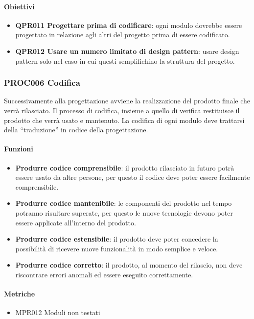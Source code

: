         \paragraph*{Obiettivi}
        \begin{itemize}
            \item \textbf{QPR011 Progettare prima di codificare}: ogni modulo dovrebbe essere progettato in relazione agli altri del progetto prima di essere codificato.
            \item \textbf{QPR012 Usare un numero limitato di design pattern}: usare design pattern solo nel caso in cui questi semplifichino la struttura del progetto.
        \end{itemize}

    \subsubsection{PROC006 Codifica}\label{proc006}
    Successivamente alla progettazione avviene la realizzazione del prodotto finale che verrà rilasciato. Il processo di codifica, insieme a quello di verifica restituisce il prodotto che verrà usato e mantenuto. La codifica di ogni modulo deve trattarsi della ``traduzione'' in codice della progettazione.

        \paragraph*{Funzioni}
        \begin{itemize}
            \item \textbf{Produrre codice comprensibile}: il prodotto rilasciato in futuro potrà essere usato da altre persone, per questo il codice deve poter essere facilmente comprensibile.
            \item \textbf{Produrre codice mantenibile}: le componenti del prodotto nel tempo potranno risultare superate, per questo le nuove tecnologie devono poter essere applicate all'interno del prodotto.
            \item \textbf{Produrre codice estensibile}: il prodotto deve poter concedere la possibilità di ricevere nuove funzionalità in modo semplice e veloce.
            \item \textbf{Produrre codice corretto}: il prodotto, al momento del rilascio, non deve riscontrare errori anomali ed essere eseguito correttamente.
        \end{itemize}

        \paragraph*{Metriche}
        \begin{itemize}
            \item MPR012 Moduli non testati
        \end{itemize}

